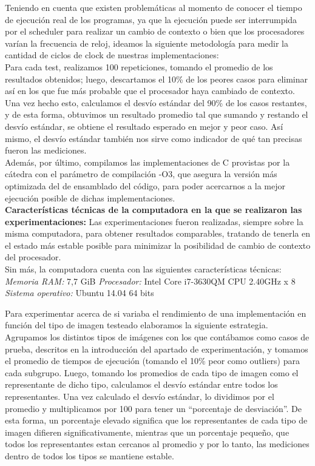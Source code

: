 Teniendo en cuenta que existen problemáticas al momento de conocer el tiempo de ejecución real de los programas, ya que la ejecución puede ser interrumpida por el scheduler para realizar un cambio de contexto o bien que los procesadores varían la frecuencia de reloj, ideamos la siguiente metodología para medir la cantidad de ciclos de clock de nuestras implementaciones:\\
Para cada test, realizamos 100 repeticiones, tomando el promedio de los resultados obtenidos; luego, descartamos el 10\% de los peores casos para eliminar así en los que fue más probable que el procesador haya cambiado de contexto. Una vez hecho esto, calculamos el desvío estándar del 90\% de los casos restantes, y de esta forma, obtuvimos un resultado promedio tal que sumando y restando el desvío estándar, se obtiene el resultado esperado en mejor y peor caso. Así mismo, el desvío estándar también nos sirve como indicador de qué tan precisas fueron las mediciones.\\
Además, por último, compilamos las implementaciones de C provistas por la cátedra con el parámetro de compilación -O3, que asegura la versión más optimizada del de ensamblado del código, para poder acercarnos a la mejor ejecución posible de dichas implementaciones.\\

\textbf{Características técnicas de la computadora en la que se realizaron las experimentaciones:}
Las experimentaciones fueron realizadas, siempre sobre la misma computadora, para obtener resultados comparables, tratando de tenerla en el estado más estable posible para minimizar la posibilidad de cambio de contexto del procesador.\\
Sin más, la computadora cuenta con las siguientes características técnicas:\\

\textit{Memoria RAM:} 7,7 GiB
\textit{Procesador:} Intel Core i7-3630QM CPU \@ 2.40GHz x 8
\textit{Sistema operativo:} Ubuntu 14.04 64 bits

Para experimentar acerca de si variaba el rendimiento de una implementación en función del tipo de imagen testeado elaboramos la siguiente estrategia. Agrupamos los distintos tipos de imágenes con los que contábamos como casos de prueba, descritos en la introducción del apartado de experimentación, y tomamos el promedio de tiempos de ejecución (tomando el 10\% peor como outliers) para cada subgrupo. Luego, tomando los promedios de cada tipo de imagen como el representante de dicho tipo, calculamos el desvío estándar entre todos los representantes. Una vez calculado el desvío estándar, lo dividimos por el promedio y multiplicamos por 100 para tener un “porcentaje de desviación”. De esta forma, un porcentaje elevado significa que los representantes de cada tipo de imagen difieren significativamente, mientras que un porcentaje pequeño, que todos los representantes estan cercanos al promedio y por lo tanto, las mediciones dentro de todos los tipos se mantiene estable.\\

